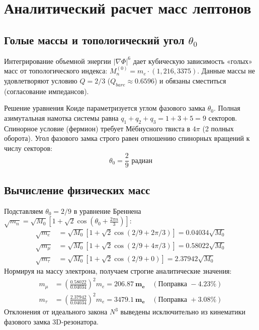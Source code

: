 \documentclass[12pt,a4paper]{article}
\begin{document}
	\section{Аналитический расчет масс лептонов}
	
	\subsection{Голые массы и топологический угол $\theta_0$}
	Интегрирование объемной энергии $|\nabla \Phi|^6$ дает кубическую зависимость «голых» масс от топологического индекса: $M_n^{(0)} = m_e \cdot (1, 216, 3375)$. Данные массы не удовлетворяют условию $Q=2/3$ ($Q_{bare} \approx 0.6596$) и обязаны сместиться (согласование импедансов).
	
	Решение уравнения Коиде параметризуется углом фазового замка $\theta_0$. 
	Полная азимутальная намотка системы равна $q_1 + q_2 + q_3 = 1 + 3 + 5 = 9$ секторов. Спинорное условие (фермион) требует Мёбиусного твиста в $4\pi$ (2 полных оборота). Угол фазового замка строго равен отношению спинорных вращений к числу секторов:
	\begin{equation}
		\theta_0 = \frac{2}{9} \text{ радиан}
	\end{equation}
	
	\subsection{Вычисление физических масс}
	Подставляем $\theta_0 = 2/9$ в уравнение Бреннена $\sqrt{m_n} = \sqrt{M_0} [1 + \sqrt{2} \cos(\theta_0 + \frac{2\pi n}{3})]$:
	\begin{align}
		\sqrt{m_e} &= \sqrt{M_0} [1 + \sqrt{2}\cos(2/9 + 2\pi/3)] = 0.04034 \sqrt{M_0} \\
		\sqrt{m_\mu} &= \sqrt{M_0} [1 + \sqrt{2}\cos(2/9 + 4\pi/3)] = 0.58022 \sqrt{M_0} \\
		\sqrt{m_\tau} &= \sqrt{M_0} [1 + \sqrt{2}\cos(2/9 + 0)] = 2.37942 \sqrt{M_0}
	\end{align}
	Нормируя на массу электрона, получаем строгие аналитические значения:
	\begin{align}
		m_\mu &= \left(\frac{0.58022}{0.04034}\right)^2 m_e = \mathbf{206.87 \ m_e} \quad (\text{Поправка } -4.23\%) \\
		m_\tau &= \left(\frac{2.37942}{0.04034}\right)^2 m_e = \mathbf{3479.1 \ m_e} \quad (\text{Поправка } +3.08\%)
	\end{align}
	Отклонения от идеального закона $N^3$ выведены исключительно из кинематики фазового замка 3D-резонатора.
\end{document}

